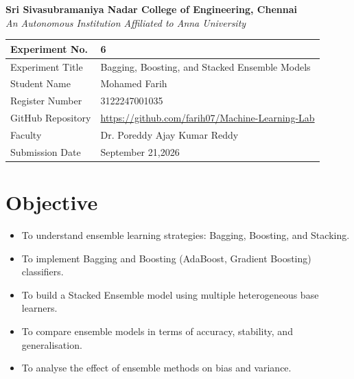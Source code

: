 \documentclass[12pt,a4paper]{article}
\begin{document}
\begin{center}
  \textbf{\large Sri Sivasubramaniya Nadar College of Engineering, Chennai}\\[4pt]
  \textit{An Autonomous Institution Affiliated to Anna University}\\[12pt]
\end{center}

\begin{tabular}{|p{4cm}|p{11cm}|}
\hline
Experiment No. & 6 \\ \hline
Experiment Title & Bagging, Boosting, and Stacked Ensemble Models \\ \hline
Student Name & Mohamed Farih \\ \hline
Register Number & 3122247001035 \\ \hline
GitHub Repository & \url{https://github.com/farih07/Machine-Learning-Lab} \\ \hline
Faculty & Dr. Poreddy Ajay Kumar Reddy \\ \hline
Submission Date & September 21,2026 \\ \hline
\end{tabular}

\vspace{1cm}

\section{Objective}
\begin{itemize}[noitemsep]
  \item To understand ensemble learning strategies: Bagging, Boosting, and Stacking.
  \item To implement Bagging and Boosting (AdaBoost, Gradient Boosting) classifiers.
  \item To build a Stacked Ensemble model using multiple heterogeneous base learners.
  \item To compare ensemble models in terms of accuracy, stability, and generalisation.
  \item To analyse the effect of ensemble methods on bias and variance.
\end{itemize}

\end{document}
